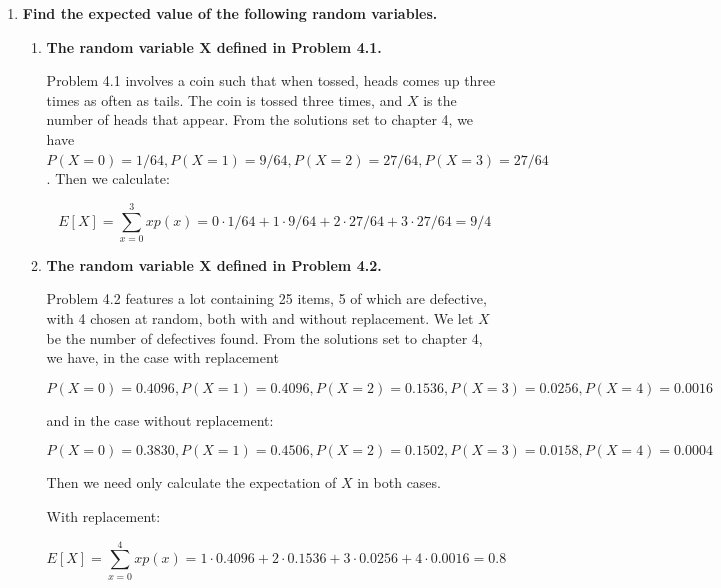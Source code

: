 \documentclass[10pt, oneside]{article}
\begin{document}
\begin{enumerate}[label=7.\arabic*]
\itemsep0em 
\item  \begin{tcolorbox}[
  colback=Cerulean!5!white,
  colframe=Cerulean!75!black]
\textbf{Find the expected value of the following random variables.}
\end{tcolorbox}

	\begin{enumerate}
	\item  \begin{tcolorbox}[
	  colback=Cerulean!5!white,
	  colframe=Cerulean!75!black]
	\textbf{The random variable $\bm{X}$ defined in Problem 4.1.}
	\end{tcolorbox}
	
	Problem 4.1 involves a coin such that when tossed, heads comes up three times as often as tails. The coin is tossed three times, and $X$ is the number of heads that appear. From the solutions set to chapter 4, we have $P(X = 0) = 1/64, P(X = 1) = 9/64, P(X = 2) = 27/64, P(X = 3) = 27/64$. Then we calculate:
	
	\[ E[X] = \sum^3_{x=0} xp(x) = 0 \cdot 1/64 + 1 \cdot 9/64 + 2 \cdot 27/64 + 3 \cdot 27/64 = \boxed{9/4} \]
	
	\item  \begin{tcolorbox}[
	  colback=Cerulean!5!white,
	  colframe=Cerulean!75!black]
	\textbf{The random variable $\bm{X}$ defined in Problem 4.2.}
	\end{tcolorbox}
	
	Problem 4.2 features a lot containing 25 items, 5 of which are defective, with 4 chosen at random, both with and without replacement. We let $X$ be the number of defectives found. From the solutions set to chapter 4, we have, in the case with replacement
	
	 \[ P(X=0) = 0.4096, P(X = 1) = 0.4096, P(X = 2) = 0.1536, P(X = 3) = 0.0256, P(X = 4) = 0.0016 \]
	 
	 and in the case without replacement:
	 
	  \[ P(X=0) = 0.3830, P(X = 1) = 0.4506, P(X = 2) = 0.1502, P(X = 3) = 0.0158, P(X = 4) = 0.0004 \]

	Then we need only calculate the expectation of $X$ in both cases.
	
	With replacement:
	
	\[ E[X] = \sum^4_{x=0} x p(x) = 1 \cdot 0.4096 + 2 \cdot 0.1536 + 3 \cdot 0.0256 + 4 \cdot 0.0016 = \boxed{0.8} \]
	

\end{enumerate}
\end{enumerate}
\end{document}
